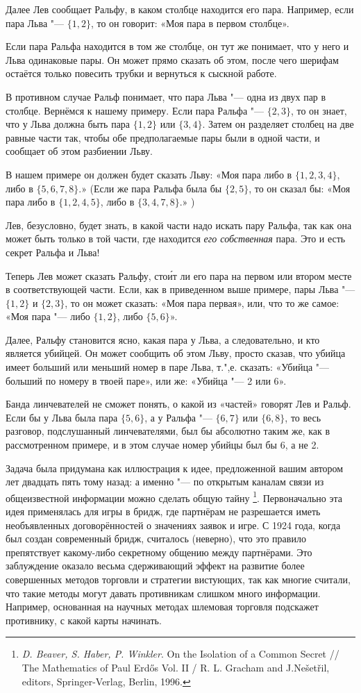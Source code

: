 \documentclass[twoside]{book}
\begin{document}
Далее Лев сообщает Ральфу, в каком столбце находится его пара.
Например, если пара Льва "--- $\{1,2\}$, то он говорит: «Моя пара в первом столбце». 

Если пара Ральфа находится в том же столбце, он тут же понимает, что у него и Льва одинаковые пары.
Он может прямо сказать об этом, после чего шерифам остаётся только повесить трубки и вернуться к сыскной работе.

В противном случае Ральф понимает, что пара Льва "--- одна из двух пар в столбце.
Вернёмся к нашему примеру.
Если пара Ральфа "--- $\{2,3\}$, то он знает, что у Льва должна быть пара $\{1,2\}$ или $\{3,4\}$.
Затем он разделяет столбец на две равные части так, чтобы обе предполагаемые пары были в одной части, и сообщает об этом разбиении Льву.

В нашем примере он должен будет сказать Льву: «Моя пара либо в $\{1,2,3,4\}$, либо в $\{5,6,7,8\}$.» (Если же пара Ральфа была бы $\{2,5\}$, то он сказал бы: «Моя пара либо в $\{1,2,4,5\}$, либо в $\{3,4,7,8\}$.» )

Лев, безусловно, будет знать, в какой части надо искать пару Ральфа, так как она может быть только в той части, где находится \emph{его собственная} пара.
Это и есть секрет Ральфа и Льва!

Теперь Лев может сказать Ральфу, сто\'{и}т ли его пара на первом или втором месте в соответствующей части.
Если, как в приведенном выше примере, пары Льва "--- $\{1,2\}$ и $\{2,3\}$, то он может сказать: «Моя пара первая», или, что то же самое: «Моя пара "--- либо $\{1,2\}$, либо $\{5,6\}$».

Далее, Ральфу становится ясно, какая пара у Льва, а следовательно, и кто является убийцей.
Он может сообщить об этом Льву, просто сказав, что убийца  имеет больший или меньший номер в паре Льва, т.",е. сказать: «Убийца "--- больший по номеру в твоей паре», или же: «Убийца "--- 2 или 6».

Банда линчевателей не сможет понять, о какой из «частей» говорят Лев и Ральф.
Если бы у Льва была пара $\{5,6\}$, а у Ральфа "--- $\{6,7\}$ или $\{6,8\}$, то весь разговор, подслушанный линчевателями, был бы абсолютно таким же, как в рассмотренном примере, и в этом случае номер убийцы был бы 6, а не 2.
\heart
 
Задача была придумана как иллюстрация к идее, предложенной вашим автором лет двадцать пять тому назад:
а именно "--- по открытым каналам связи из общеизвестной информации можно сделать общую тайну%
\footnote{\emph{D. Beaver, S. Haber, P. Winkler}. On the Isolation of a Common Secret /\!/ {The Mathematics of Paul Erd\H{o}s} Vol. II / R. L. Gracham and J.Ne\v{s}et\v{r}il, editors, Springer-Verlag, Berlin, 1996.}.
Первоначально эта идея применялась для игры в бридж, где партнёрам не разрешается иметь необъявленных договорённостей о значениях заявок и игре.
С 1924 года, когда был создан современный бридж, считалось (неверно), что это правило препятствует какому-либо секретному общению между партнёрами.
Это заблуждение оказало весьма сдерживающий эффект на развитие более совершенных методов торговли и стратегии вистующих, так как многие считали, что такие методы могут давать противникам слишком много информации.
Например, основанная на научных методах шлемовая торговля подскажет противнику, с какой карты начинать.
\end{document}

